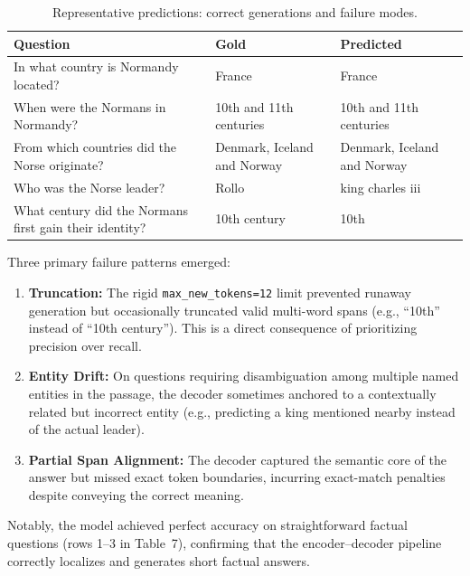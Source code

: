 \documentclass[10pt,twocolumn]{article}
\begin{document}
\begin{table}[H]
\centering
\scriptsize
\caption{Representative predictions: correct generations and failure modes.}
\begin{tabularx}{\columnwidth}{@{}p{} X X@{}}
\toprule
\textbf{Question} & \textbf{Gold} & \textbf{Predicted} \\
\midrule
\rowcolor{green!6}
In what country is Normandy located? & France & France \\
\rowcolor{green!6}
When were the Normans in Normandy? & 10th and 11th centuries & 10th and 11th centuries \\
\rowcolor{green!6}
From which countries did the Norse originate? & Denmark, Iceland and Norway & Denmark, Iceland and Norway \\
\midrule
\rowcolor{red!6}
Who was the Norse leader? & Rollo & king charles iii \\
\rowcolor{red!6}
What century did the Normans first gain their identity? & 10th century & 10th \\
\bottomrule
\end{tabularx}
\end{table}

Three primary failure patterns emerged:
\begin{enumerate}[leftmargin=1.2em,noitemsep,topsep=2pt]
\item \textbf{Truncation:} The rigid \texttt{max\_new\_tokens=12} limit prevented runaway generation but occasionally truncated valid multi-word spans (e.g., ``10th'' instead of ``10th century''). This is a direct consequence of prioritizing precision over recall.
\item \textbf{Entity Drift:} On questions requiring disambiguation among multiple named entities in the passage, the decoder sometimes anchored to a contextually related but incorrect entity (e.g., predicting a king mentioned nearby instead of the actual leader).
\item \textbf{Partial Span Alignment:} The decoder captured the semantic core of the answer but missed exact token boundaries, incurring exact-match penalties despite conveying the correct meaning.
\end{enumerate}

Notably, the model achieved perfect accuracy on straightforward factual questions (rows 1--3 in Table~7), confirming that the encoder--decoder pipeline correctly localizes and generates short factual answers.

\end{document}
